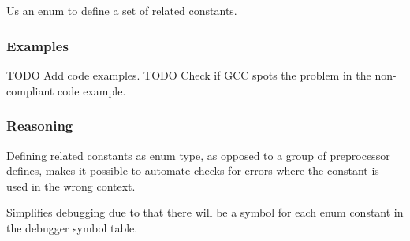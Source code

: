\subsection*{\myRule{}}

Us an enum to define a set of related constants.

\subsubsection*{Examples}

TODO Add code examples.
TODO Check if GCC spots the problem in the non-compliant code example.

\subsubsection{Reasoning}

Defining related constants as enum type, as opposed to a group of preprocessor defines, makes it possible to automate checks for errors where the constant is used in the wrong context.

Simplifies debugging due to that there will be a symbol for each enum constant in the debugger symbol table.

